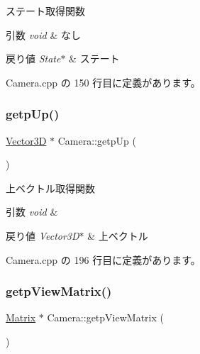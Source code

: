 ステート取得関数 


\begin{DoxyParams}{引数}
{\em void} & なし \\
\hline
\end{DoxyParams}

\begin{DoxyRetVals}{戻り値}
{\em State$\ast$} & ステート \\
\hline
\end{DoxyRetVals}


 Camera.\+cpp の 150 行目に定義があります。

\mbox{\label{class_camera_a519361bbdc75f342e7f7754dac1f4e49}} 
\subsubsection{\texorpdfstring{getp\+Up()}{getpUp()}}
{\footnotesize\ttfamily \mbox{\hyperlink{class_vector3_d}{Vector3D}} $\ast$ Camera\+::getp\+Up (\begin{DoxyParamCaption}{ }\end{DoxyParamCaption})}



上ベクトル取得関数 


\begin{DoxyParams}{引数}
{\em void} & \\
\hline
\end{DoxyParams}

\begin{DoxyRetVals}{戻り値}
{\em Vector3\+D$\ast$} & 上ベクトル \\
\hline
\end{DoxyRetVals}


 Camera.\+cpp の 196 行目に定義があります。

\mbox{\label{class_camera_a754251a0c028649cc5ca1b58efa41886}} 
\subsubsection{\texorpdfstring{getp\+View\+Matrix()}{getpViewMatrix()}}
{\footnotesize\ttfamily \mbox{\hyperlink{class_matrix}{Matrix}} $\ast$ Camera\+::getp\+View\+Matrix (\begin{DoxyParamCaption}{ }\end{DoxyParamCaption})}



